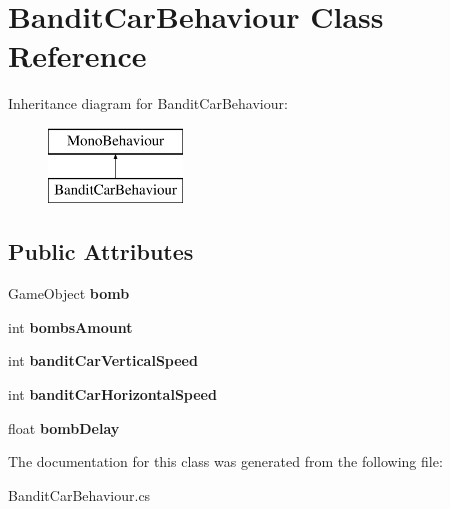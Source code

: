 \hypertarget{class_bandit_car_behaviour}{}\section{Bandit\+Car\+Behaviour Class Reference}
\label{class_bandit_car_behaviour}
Inheritance diagram for Bandit\+Car\+Behaviour\+:\begin{figure}[H]
\begin{center}
\leavevmode
\includegraphics[height=2.000000cm]{class_bandit_car_behaviour}
\end{center}
\end{figure}
\subsection*{Public Attributes}
\begin{DoxyCompactItemize}
\item 
\mbox{\label{class_bandit_car_behaviour_ae3b2699766531daf8718995e49cff662}} 
Game\+Object {\bfseries bomb}
\item 
\mbox{\label{class_bandit_car_behaviour_ad9ae8b1ef175f4105f1cd5b22ffdd4b4}} 
int {\bfseries bombs\+Amount}
\item 
\mbox{\label{class_bandit_car_behaviour_ac9802f2a6c5d6131364379c71e46c48f}} 
int {\bfseries bandit\+Car\+Vertical\+Speed}
\item 
\mbox{\label{class_bandit_car_behaviour_a698082f755c1bb892c7b28bbc37374d3}} 
int {\bfseries bandit\+Car\+Horizontal\+Speed}
\item 
\mbox{\label{class_bandit_car_behaviour_a7d6ea6ee5ed41e1816340d7db49c00be}} 
float {\bfseries bomb\+Delay}
\end{DoxyCompactItemize}


The documentation for this class was generated from the following file\+:\begin{DoxyCompactItemize}
\item 
Bandit\+Car\+Behaviour.\+cs\end{DoxyCompactItemize}
